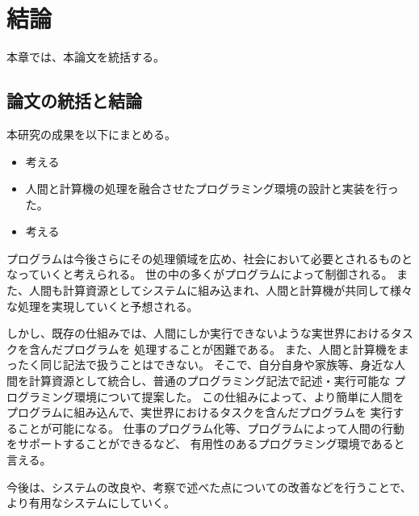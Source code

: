 \chapter{結論}\label{chap:conclusion}

本章では、本論文を統括する。

\section{論文の統括と結論}\label{ux8ad6ux6587ux306eux7d71ux62ecux3068ux7d50ux8ad6}

本研究の成果を以下にまとめる。

\begin{itemize}
\itemsep1pt\parskip0pt
\item
  考える
\item
  人間と計算機の処理を融合させたプログラミング環境の設計と実装を行った。
\item
  考える
\end{itemize}

プログラムは今後さらにその処理領域を広め、社会において必要とされるものとなっていくと考えられる。
世の中の多くがプログラムによって制御される。
また、人間も計算資源としてシステムに組み込まれ、人間と計算機が共同して様々な処理を実現していくと予想される。

しかし、既存の仕組みでは、人間にしか実行できないような実世界におけるタスクを含んだプログラムを
処理することが困難である。
また、人間と計算機をまったく同じ記法で扱うことはできない。
そこで、自分自身や家族等、身近な人間を計算資源として統合し、普通のプログラミング記法で記述・実行可能な
プログラミング環境について提案した。
この仕組みによって、より簡単に人間をプログラムに組み込んで、実世界におけるタスクを含んだプログラムを
実行することが可能になる。
仕事のプログラム化等、プログラムによって人間の行動をサポートすることができるなど、
有用性のあるプログラミング環境であると言える。

今後は、システムの改良や、考察で述べた点についての改善などを行うことで、
より有用なシステムにしていく。
